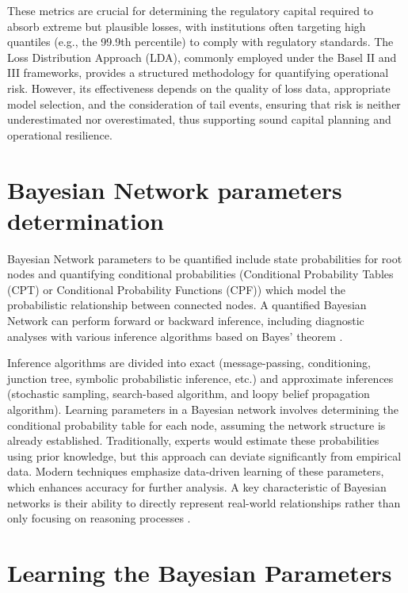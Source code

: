 These metrics are crucial for determining the regulatory capital required to absorb extreme but plausible losses, with institutions often targeting high quantiles (e.g., the 99.9th percentile) to comply with regulatory standards. The Loss Distribution Approach (LDA), commonly employed under the Basel II and III frameworks, provides a structured methodology for quantifying operational risk. However, its effectiveness depends on the quality of loss data, appropriate model selection, and the consideration of tail events, ensuring that risk is neither underestimated nor overestimated, thus supporting sound capital planning and operational resilience.

\section*{Bayesian Network parameters determination}

Bayesian Network parameters to be quantified include state probabilities for root nodes and quantifying conditional probabilities (Conditional Probability Tables (CPT) or Conditional Probability Functions (CPF)) which model the probabilistic relationship between connected nodes. A quantified Bayesian Network can perform forward or backward inference, including diagnostic analyses with various inference algorithms based on Bayes’ theorem \parencite{moradi_integration_2022}.

Inference algorithms are divided into exact (message-passing, conditioning, junction tree, symbolic probabilistic inference, etc.) and approximate inferences (stochastic sampling, search-based algorithm, and loopy belief propagation algorithm). Learning parameters in a Bayesian network involves determining the conditional probability table for each node, assuming the network structure is already established. Traditionally, experts would estimate these probabilities using prior knowledge, but this approach can deviate significantly from empirical data. Modern techniques emphasize data-driven learning of these parameters, which enhances accuracy for further analysis. A key characteristic of Bayesian networks is their ability to directly represent real-world relationships rather than only focusing on reasoning processes \parencite{Chaoyu2020}.

\section*{Learning the Bayesian Parameters}

